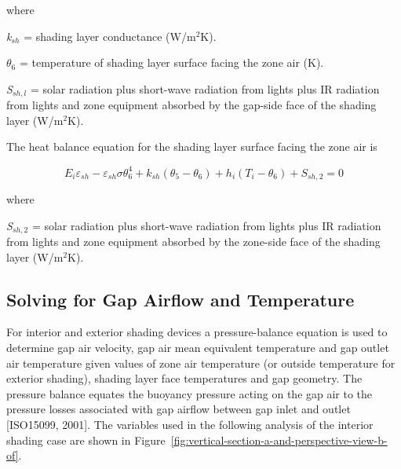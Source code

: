 where

\emph{k\(_{sh}\)} = shading layer conductance (W/m\(^{2}\)K).

\emph{$\theta$\(_{6}\)} = temperature of shading layer surface facing the zone air (K).

\emph{S\(_{sh,l}\)} = solar radiation plus short-wave radiation from lights plus IR radiation from lights and zone equipment absorbed by the gap-side face of the shading layer (W/m\(^{2}\)K).

The heat balance equation for the shading layer surface facing the zone air is

\begin{equation}
{E_i}{\varepsilon_{sh}} - {\varepsilon_{sh}}\sigma \theta_6^4 + {k_{sh}}\left( {{\theta_5} - {\theta_6}} \right) + {h_i}\left( {{T_i} - {\theta_6}} \right) + {S_{sh,2}} = 0
\end{equation}

where

\emph{S\(_{sh,2}\)} = solar radiation plus short-wave radiation from lights plus IR radiation from lights and zone equipment absorbed by the zone-side face of the shading layer (W/m\(^{2}\)K).

\subsection{Solving for Gap Airflow and Temperature}\label{solving-for-gap-airflow-and-temperature}

For interior and exterior shading devices a pressure-balance equation is used to determine gap air velocity, gap air mean equivalent temperature and gap outlet air temperature given values of zone air temperature (or outside temperature for exterior shading), shading layer face temperatures and gap geometry. The pressure balance equates the buoyancy pressure acting on the gap air to the pressure losses associated with gap airflow between gap inlet and outlet {[}ISO15099, 2001{]}. The variables used in the following analysis of the interior shading case are shown in Figure~\ref{fig:vertical-section-a-and-perspective-view-b-of}.

